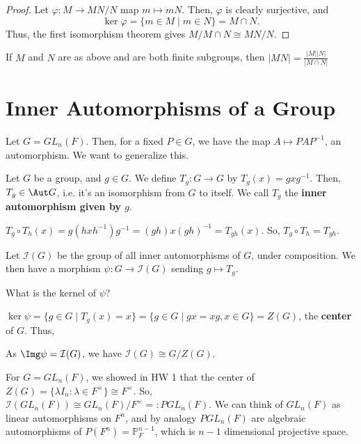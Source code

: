 \begin{proof}
    Let $\varphi:M \to MN/N$ map $m \mapsto mN$. Then, $\varphi$ is clearly surjective, and
    $$\ker \varphi =\{ m \in M \mid m \in N\} = M \cap N.$$
    Thus, the first isomorphism theorem gives $M /M \cap N \cong MN/N$.
\end{proof}

\begin{cor}
    If $M$ and $N$ are as above and are both finite subgroups, then $|MN| = \frac{|M||N|}{|M \cap N|}$
\end{cor}

\section{Inner Automorphisms of a Group}

Let $G = GL_n(F)$. Then, for a fixed $P \in G$, we have the map $A \mapsto PAP^{-1}$, an automorphism. We want to generalize this.

\begin{defn}
    Let $G$ be a group, and $g\in G.$ We define $T_g:G\to G$ by $T_g(x)=gxg^{-1}$. Then, $T_g \in \Aut G$, i.e. it's an isomorphism from $G$ to itself. We call $T_g$ the \textbf{inner automorphism given by $g$}.
\end{defn}

\begin{notebox*}
    $T_g \circ T_h(x)=g(hxh^{-1})g^{-1}=(gh)x(gh)^{-1}=T_{gh}(x)$. So, $T_g \circ T_h = T_{gh}$.
\end{notebox*}

\begin{defn}
    Let $\mathcal I(G)$ be the group of all inner automorphisms of $G$, under composition. We then have a morphism $\psi :G \to \mathcal I(G)$ sending $g \mapsto T_g$.
\end{defn}

What is the kernel of $\psi$?

$\ker \psi = \{g \in G \mid T_g(x) = x\}=\{g \in G\mid gx=xg,x\in G\}=Z(G)$, the \textbf{center} of $G$. Thus,

\begin{prop}
    As $\Img \psi = \mathcal I(G)$, we have $\mathcal I(G) \cong G/Z(G)$.
\end{prop}

\begin{ex}
    For $G = GL_n(F)$, we showed in HW 1 that the center of $Z(G) =\{\lambda I_n:\lambda \in F^\times\}\cong F^\times$. So, $\mathcal I(GL_n(F)) \cong GL_n(F)/F^\times=: PGL_n(F)$. We can think of $GL_n(F)$ as linear automorphisms on $F^n$, and by analogy $PGL_n(F)$ are algebraic automorphisms of $P(F^n)=\mathbb P^{n-1}_F$, which is $n-1$ dimensional projective space.
\end{ex}

